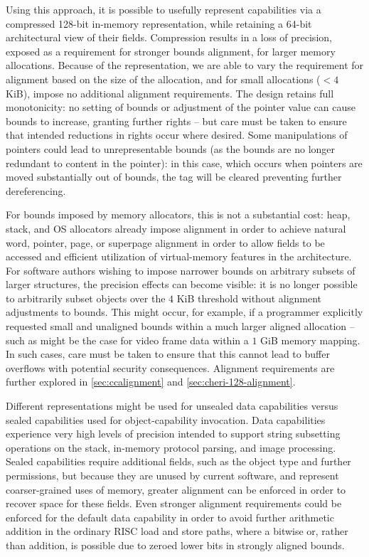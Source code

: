 Using this approach, it is possible to usefully represent capabilities via a
compressed 128-bit in-memory representation, while retaining a 64-bit
architectural view of their fields.
Compression results in a loss of precision, exposed as a requirement for stronger
bounds alignment, for larger memory allocations.
Because of the representation, we are able to vary the
requirement for alignment based on the size of the allocation, and for small
allocations ($< 4$ KiB), impose no additional alignment requirements.
The design retains full monotonicity: no setting of bounds or adjustment of
the pointer value can cause bounds to increase, granting further rights -- but
care must be taken to ensure that intended reductions in rights occur where
desired.
Some manipulations of pointers could lead to unrepresentable bounds (as the
bounds are no longer redundant to content in the pointer): in this case, which
occurs when pointers are moved substantially out of bounds, the tag will be
cleared preventing further dereferencing.

For bounds imposed by memory allocators, this is not a substantial cost:
heap, stack, and OS allocators already impose alignment in order to achieve
natural word, pointer, page, or superpage alignment in order to allow fields
to be accessed and efficient utilization of virtual-memory features in the
architecture.
For software authors wishing to impose narrower bounds on arbitrary subsets of
larger structures, the precision effects can become visible: it is no longer
possible to arbitrarily subset objects over the $4$ KiB threshold without
alignment adjustments to bounds.
This might occur, for example, if a programmer explicitly requested small and
unaligned bounds within a much larger aligned allocation -- such as might be
the case for video frame data within a $1$ GiB memory mapping.
In such cases, care must be taken to ensure that this cannot lead to buffer
overflows with potential security consequences.  Alignment
requirements are further explored in \cref{sec:ccalignment} and \cref{sec:cheri-128-alignment}.

Different representations might be used for unsealed data capabilities versus
sealed capabilities used for object-capability invocation.
Data capabilities experience very high levels of precision intended to support
string subsetting operations on the stack, in-memory protocol parsing, and
image processing.
Sealed capabilities require additional fields, such as the object type and
further permissions, but because they are unused by current software, and
represent coarser-grained uses of memory, greater alignment can be enforced in
order to recover space for these fields.
Even stronger alignment requirements could be enforced for the default data
capability in order to avoid further arithmetic addition in the ordinary RISC
load and store paths, where a bitwise or, rather than addition, is possible
due to zeroed lower bits in strongly aligned bounds.

